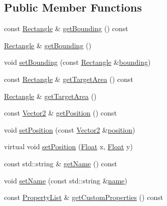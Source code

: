 \subsection*{Public Member Functions}
\begin{DoxyCompactItemize}
\item 
const \hyperlink{classZeta_1_1Rectangle}{Rectangle} \& \hyperlink{classZeta_1_1Object_a8b16181788abd146eb33c1bf14ebe032}{get\+Bounding} () const 
\item 
\hyperlink{classZeta_1_1Rectangle}{Rectangle} \& \hyperlink{classZeta_1_1Object_a07ddb0faf04d91e0c5497e518fe36d54}{get\+Bounding} ()
\item 
void \hyperlink{classZeta_1_1Object_a2fa22178b6795a2dbe27becd334576a9}{set\+Bounding} (const \hyperlink{classZeta_1_1Rectangle}{Rectangle} \&\hyperlink{classZeta_1_1Object_a7dc7d781f8f3d6f38860b4df26fc58c4}{bounding})
\item 
const \hyperlink{classZeta_1_1Rectangle}{Rectangle} \& \hyperlink{classZeta_1_1Object_a783dccb1e186f4bf199fd0b304a37aa1}{get\+Target\+Area} () const 
\item 
\hyperlink{classZeta_1_1Rectangle}{Rectangle} \& \hyperlink{classZeta_1_1Object_a06561d91db89be83194bf6514e65d91c}{get\+Target\+Area} ()
\item 
const \hyperlink{classZeta_1_1Vector2}{Vector2} \& \hyperlink{classZeta_1_1Object_aae8d77cba6bd50478d56310ac82abb30}{get\+Position} () const 
\item 
void \hyperlink{classZeta_1_1Object_a145aeca2fc9b1e148410aa8dc7bd9a3b}{set\+Position} (const \hyperlink{classZeta_1_1Vector2}{Vector2} \&\hyperlink{classZeta_1_1Object_a4035f758ac73cb1f0e4d85778d033956}{position})
\item 
virtual void \hyperlink{classZeta_1_1Object_a17dcbaf63f7611fdc2beb94c196b2ed7}{set\+Position} (\hyperlink{namespaceZeta_a1e0a1265f9b3bd3075fb0fabd39088ba}{Float} x, \hyperlink{namespaceZeta_a1e0a1265f9b3bd3075fb0fabd39088ba}{Float} y)
\item 
const std\+::string \& \hyperlink{classZeta_1_1Object_a553e358963e2b0b1ccce68f8487078a3}{get\+Name} () const 
\item 
void \hyperlink{classZeta_1_1Object_a58cbdf64f3a92a4b8a5423fba28b019e}{set\+Name} (const std\+::string \&\hyperlink{classZeta_1_1Object_ace4ef81b7c300e0a170292e9888cd66f}{name})
\item 
const \hyperlink{classZeta_1_1PropertyList}{Property\+List} \& \hyperlink{classZeta_1_1Object_a0c1d4c353847dd343cf01a9d21889f76}{get\+Custom\+Properties} () const 

\end{DoxyCompactItemize}
